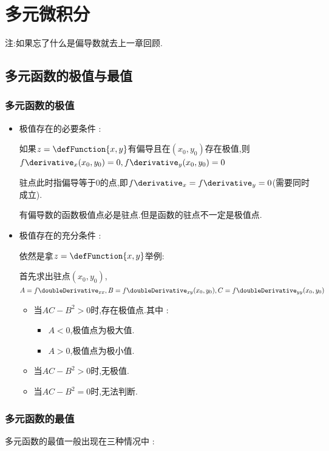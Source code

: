 \chapter{多元微积分}{
注:如果忘了什么是偏导数就去上一章回顾.

\section{多元函数的极值与最值}{

  \subsection{多元函数的极值}{
    \begin{itemize}
      \item {
            极值存在的必要条件 :

            如果$z = \defFunction{x,y}$有偏导且在$(x_0,y_0)$存在极值,则$f\derivative_x(x_0,y_0) = 0,f\derivative_y(x_0,y_0) = 0$

            驻点此时指偏导等于0的点,即$f\derivative_x = f\derivative_y = 0$(需要同时成立).

            有偏导数的函数极值点必是驻点.但是函数的驻点不一定是极值点.
            }
      \item {
            极值存在的充分条件 :

            依然是拿$z = \defFunction{x,y}$举例:

            首先求出驻点$(x_0,y_0)$,$A = f\doubleDerivative_{xx},B = f\doubleDerivative_{xy}(x_0,y_0),C = f\doubleDerivative_{yy}(x_0,y_0)$

            \begin{itemize}
              \item {当$AC-B^2 > 0$时,存在极值点.其中 :
                    \begin{itemize}
                      \item $A < 0$,极值点为极大值.
                      \item $A > 0$,极值点为极小值.
                    \end{itemize}
                    }
              \item 当$AC - B^2 > 0$时,无极值.
              \item 当$AC - B^2 = 0$时,无法判断.
            \end{itemize}
            }
    \end{itemize}
  }%

  \subsection{多元函数的最值}{
    多元函数的最值一般出现在三种情况中 :

}}}
